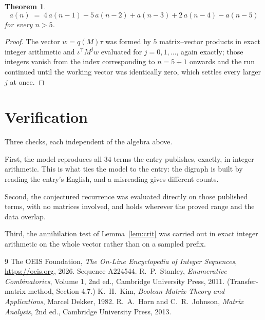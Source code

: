\documentclass[11pt,a4paper]{article}
\theoremstyle{plain}
\newtheorem{theorem}{Theorem}
\theoremstyle{definition}
\begin{document}
\begin{theorem}
\[
a(n)\;=\;4\,a(n-1) - 5\,a(n-2) + a(n-3) + 2\,a(n-4) - a(n-5)
\]
for every $n>5$.
\end{theorem}

\begin{proof}
The vector $w=q(M)\tau$ was formed by $5$ matrix--vector products in exact integer
arithmetic and $\iota^{\!\top}M^{j}w$ evaluated for $j=0,1,\dots$, again exactly; those
integers vanish from the index corresponding to $n=5+1$ onwards and the run continued
until the working vector was identically zero, which settles every larger $j$ at once.
\end{proof}

\section{Verification}

Three checks, each independent of the algebra above.

First, the model reproduces all $34$ terms the entry publishes, exactly, in integer
arithmetic. This is what ties the model to the entry: the digraph is built by reading the
entry's English, and a misreading gives different counts.

Second, the conjectured recurrence was evaluated directly on those published terms, with no
matrices involved, and holds wherever the proved range and the data overlap.

Third, the annihilation test of Lemma~\ref{lem:crit} was carried out in exact integer
arithmetic on the whole vector rather than on a sampled prefix.

\begin{thebibliography}{9}
 The OEIS Foundation, \emph{The On-Line Encyclopedia of Integer
Sequences}, \url{https://oeis.org}, 2026. Sequence A224544.
 R.~P.~Stanley, \emph{Enumerative Combinatorics}, Volume 1, 2nd ed.,
Cambridge University Press, 2011. (Transfer-matrix method, Section 4.7.)
 K.~H.~Kim, \emph{Boolean Matrix Theory and Applications}, Marcel Dekker,
1982.
 R.~A.~Horn and C.~R.~Johnson, \emph{Matrix Analysis}, 2nd ed., Cambridge
University Press, 2013.
\end{thebibliography}
\end{document}
